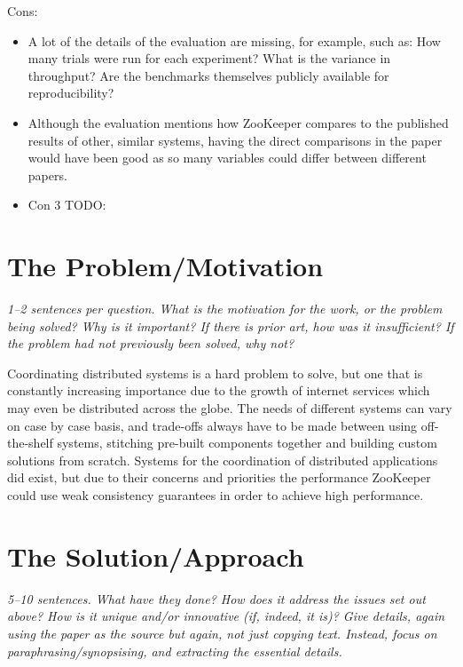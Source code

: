 \documentclass[11pt]{article}
\begin{document}
Cons:

\begin{itemize}

    \item A lot of the details of the evaluation are missing, for example, such
    as: How many trials were run for each experiment? What is the variance in
    throughput? Are the benchmarks themselves publicly available for
    reproducibility?

    \item Although the evaluation mentions how ZooKeeper compares to the
    published results of other, similar systems, having the direct comparisons
    in the paper would have been good as so many variables could differ between
    different papers.

    \item Con 3 TODO:

\end{itemize}

\section*{The Problem/Motivation}

\textsl{1--2 sentences per question. What is the motivation for the work, or
the problem being solved? Why is it important? If there is prior art, how was
it insufficient? If the problem had not previously been solved, why not?}

Coordinating distributed systems is a hard problem to solve, but one that is
constantly increasing importance due to the growth of internet services which
may even be distributed across the globe. The needs of different systems can
vary on case by case basis, and trade-offs always have to be made between using
off-the-shelf systems, stitching pre-built components together and building
custom solutions from scratch. Systems for the coordination of distributed
applications did exist, but due to their concerns and priorities the
performance ZooKeeper could use weak consistency guarantees in order to achieve
high performance.

\section*{The Solution/Approach}

\textsl{5--10 sentences. What have they done? How does it address the issues
set out above? How is it unique and/or innovative (if, indeed, it is)? Give
details, again using the paper as the source but again, not just copying text.
Instead, focus on paraphrasing/synopsising, and extracting the essential
details.}
\end{document}
